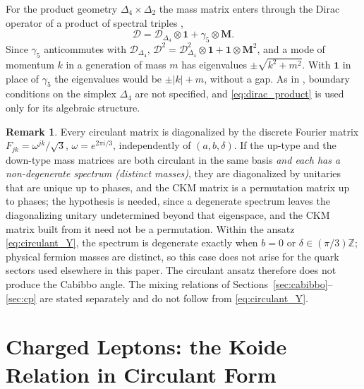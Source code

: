 \documentclass[11pt,reqno]{amsart}
\theoremstyle{definition}
\newtheorem{remark}[theorem]{Remark}
\begin{document}
For the product geometry $\Delta_4 \times \Delta_2$ the mass matrix enters through the Dirac operator of a product of spectral triples \cite{chamseddine2007gravity},
\begin{equation}\label{eq:dirac_product}
    \boldsymbol{\mathcal{D}} = \boldsymbol{\mathcal{D}}_{\Delta_4} \otimes \mathbf{1} + \gamma_5 \otimes \mathbf{M}.
\end{equation}
Since $\gamma_5$ anticommutes with $\boldsymbol{\mathcal{D}}_{\Delta_4}$, $\boldsymbol{\mathcal{D}}^2 = \boldsymbol{\mathcal{D}}_{\Delta_4}^2 \otimes \mathbf{1} + \mathbf{1} \otimes \mathbf{M}^2$, and a mode of momentum $k$ in a generation of mass $m$ has eigenvalues $\pm\sqrt{k^2 + m^2}$. With $\mathbf{1}$ in place of $\gamma_5$ the eigenvalues would be $\pm|k| + m$, without a gap. As in \cite[Ch.~12, Sec.~7]{silvafilho2026book}, boundary conditions on the simplex $\Delta_4$ are not specified, and \eqref{eq:dirac_product} is used only for its algebraic structure.

\begin{remark}\label{rem:dft}
Every circulant matrix is diagonalized by the discrete Fourier matrix $F_{jk} = \omega^{jk}/\sqrt3$, $\omega = e^{2\pi i/3}$, independently of $(a,b,\delta)$. If the up-type and the down-type mass matrices are both circulant in the same basis \emph{and each has a non-degenerate spectrum (distinct masses)}, they are diagonalized by unitaries that are unique up to phases, and the CKM matrix is a permutation matrix up to phases; the hypothesis is needed, since a degenerate spectrum leaves the diagonalizing unitary undetermined beyond that eigenspace, and the CKM matrix built from it need not be a permutation. Within the ansatz \eqref{eq:circulant_Y}, the spectrum is degenerate exactly when $b = 0$ or $\delta \in (\pi/3)\mathbb{Z}$; physical fermion masses are distinct, so this case does not arise for the quark sectors used elsewhere in this paper. The circulant ansatz therefore does not produce the Cabibbo angle. The mixing relations of Sections~\ref{sec:cabibbo}--\ref{sec:cp} are stated separately and do not follow from \eqref{eq:circulant_Y}.
\end{remark}

\section{Charged Leptons: the Koide Relation in Circulant Form}
\end{document}
